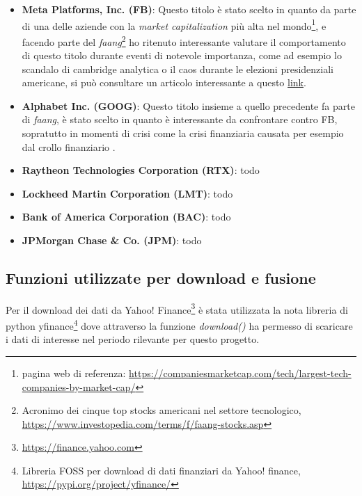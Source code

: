 \documentclass{article}
\begin{document}
\begin{itemize}
  \item \textbf{Meta Platforms, Inc. (FB)}: Questo titolo è stato scelto in quanto da parte di una delle aziende con la \emph{market capitalization} più alta nel mondo\footnote{pagina web di referenza: \href{https://companiesmarketcap.com/tech/largest-tech-companies-by-market-cap/}{https://companiesmarketcap.com/tech/largest-tech-companies-by-market-cap/}},
  e facendo parte del \emph{faang}\footnote{Acronimo dei cinque top stocks americani nel settore tecnologico, \href{https://www.investopedia.com/terms/f/faang-stocks.asp}{https://www.investopedia.com/terms/f/faang-stocks.asp}} ho ritenuto interessante
  valutare il comportamento di questo titolo durante eventi di notevole importanza, come ad esempio lo scandalo di cambridge analytica o il caos durante le elezioni presidenziali americane, si può consultare un articolo interessante a questo 
  \href{https://finance.yahoo.com/news/facebook-stock-familiar-crisis-cycle-183733316.html}{link}.

  \item \textbf{Alphabet Inc. (GOOG)}: Questo titolo insieme a quello precedente fa parte di \emph{faang}\footnotemark[2], è stato scelto in quanto è interessante da confrontare contro FB, sopratutto in momenti di crisi come la crisi finanziaria causata
  per esempio dal crollo finanziario \cite[paper di riferimento]{MAZUR2021101690}.
  
  \item \textbf{Raytheon Technologies Corporation (RTX)}: todo
  
  \item \textbf{Lockheed Martin Corporation (LMT)}: todo
  
  \item \textbf{Bank of America Corporation (BAC)}: todo
  
  \item \textbf{JPMorgan Chase \& Co. (JPM)}: todo
\end{itemize}

\subsection{Funzioni utilizzate per download e fusione}

Per il download dei dati da Yahoo! Finance\footnote{\href{https://finance.yahoo.com}{https://finance.yahoo.com}} è stata utilizzata la nota libreria di python
yfinance\footnote{Libreria FOSS per download di dati finanziari da Yahoo! finance, \href{https://pypi.org/project/yfinance/}{https://pypi.org/project/yfinance/}} dove attraverso la funzione
\emph{download()} ha permesso di scaricare i dati di interesse nel periodo rilevante per questo progetto.
\end{document}
